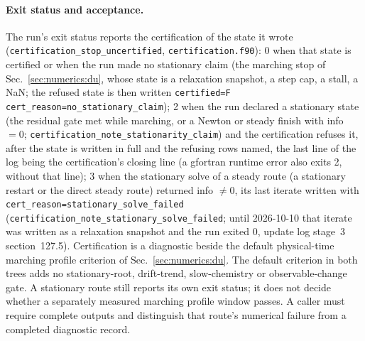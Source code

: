 \paragraph{Exit status and acceptance.}
The run's exit status reports the certification of the state it wrote
(\texttt{certification\_stop\_uncertified}, \texttt{certification.f90}): 0
when that state is certified or when the run made no stationary claim (the
marching stop of Sec.~\ref{sec:numerics:du}, whose state is a relaxation
snapshot, a step cap, a stall, a NaN; the refused state is then written
\texttt{certified=F cert\_reason=no\_stationary\_claim}); 2 when the run
declared a stationary state (the residual gate met while marching, or a
Newton or steady finish with info $=0$;
\texttt{certification\_note\_stationarity\_claim}) and the certification
refuses it, after the
state is written in full and the refusing rows named, the last line of the
log being the certification's closing line (a gfortran runtime error also
exits 2, without that line); 3 when the stationary solve of a steady route (a
stationary restart or the direct steady route) returned info $\ne0$, its last
iterate written with \texttt{cert\_reason=stationary\_solve\_failed}
(\texttt{certification\_note\_stationary\_solve\_failed}; until 2026-10-10
that iterate was written as a relaxation snapshot and the run exited 0,
update log stage~3 section~127.5).  Certification is a diagnostic beside the default physical-time
marching profile criterion of Sec.~\ref{sec:numerics:du}. The default
criterion in both trees adds no stationary-root, drift-trend, slow-chemistry or
observable-change gate. A stationary route still reports its own exit
status; it does not decide whether a separately measured marching profile
window passes. A caller must require complete outputs and distinguish
that route's numerical failure from a completed diagnostic record.

